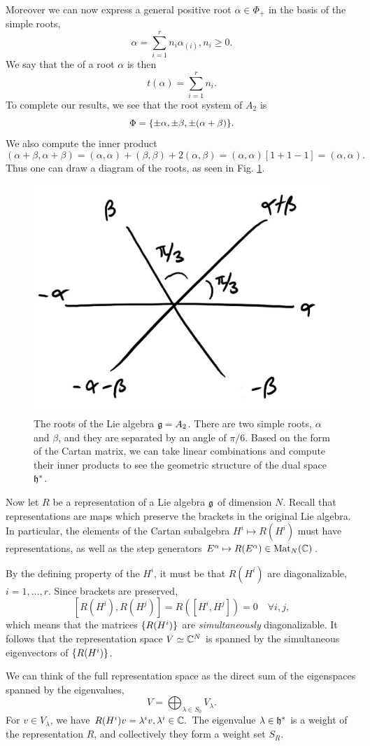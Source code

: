 Moreover we can now express a general positive root $\alpha \in \Phi_+$ in the basis of the simple roots,
$$\alpha=\sum_{i=1}^r n_i \alpha_{(i)}, n_i \geq 0.$$
We say that the  of a root $\alpha$ is then
$$t(\alpha)=\sum_{i=1}^r n_i.$$
%
To complete our results, we see that the root system of $A_2$ is
$$\Phi=\{\pm \alpha,\pm \beta,\pm(\alpha+\beta)\}.$$
We also compute the inner product $$(\alpha+\beta,\alpha+\beta)=(\alpha,\alpha)+(\beta,\beta)+2(\alpha,\beta)=(\alpha,\alpha)[1+1-1]=(\alpha,\alpha).$$
Thus one can draw a diagram of the roots, as seen in Fig. \ref{fig:rootgeometry}.
\begin{figure}
    \centering
    \includegraphics{2018/11/20181117_rootgeometry.png}
    \caption{The roots of the Lie algebra $\mathfrak{g}=A_2$. There are two simple roots, $\alpha$ and $\beta$, and they are separated by an angle of $\pi/6$. Based on the form of the Cartan matrix, we can take linear combinations and compute their inner products to see the geometric structure of the dual space $\mathfrak{h}^*$.}
    \label{fig:rootgeometry}
\end{figure}

Now let $R$ be a representation of a Lie algebra $\mathfrak{g}$ of dimension $N$. Recall that representations are maps which preserve the brackets in the original Lie algebra. In particular, the elements of the Cartan subalgebra $H^i\mapsto R(H^i)$ must have representations, as well as the step generators $E^\alpha \mapsto R(E^\alpha) \in \text{Mat}_N(\mathbb{C})$.

By the defining property of the $H^i$, it must be that $R(H^i)$ are diagonalizable, $i=1,\ldots,r$. Since brackets are preserved,
$$[R(H^i),R(H^j)]=R([H^i,H^j])=0\quad \forall i,j,$$
which means that the matrices $\{R(H^i)\}$ are \emph{simultaneously} diagonalizable. It follows that the representation space $V\simeq \mathbb{C}^N$ is spanned by the simultaneous eigenvectors of $\{R(H^i)\}$.

We can think of the full representation space as the direct sum of the eigenspaces spanned by the eigenvalues,
$$V=\bigoplus_{\lambda\in S_0} V_\lambda.$$
For $v\in V_\lambda$, we have
$R(H^i)v=\lambda^i v, \lambda^i \in \mathbb{C}.$
The eigenvalue $\lambda \in \mathfrak{h}^*$ is a weight of the representation $R$, and collectively they form a weight set $S_R.$